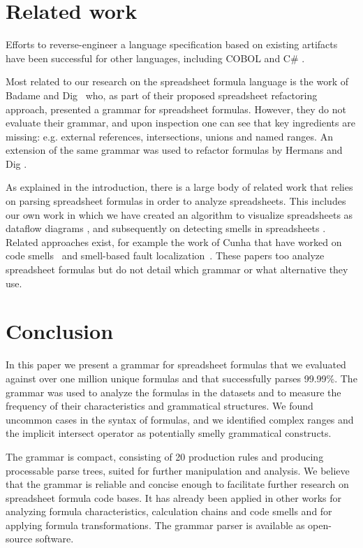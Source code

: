 \documentclass[conference]{IEEEtran}
\begin{document}
\section{Related work}
\label{section:relatedWork}
Efforts to reverse-engineer a language specification based on existing artifacts have been successful for other languages, including COBOL \cite{van1997obtaining} and C\# \cite{zaytsev2010recovery}.

Most related to our research on the spreadsheet formula language is the work of Badame and Dig~\cite{badame2012refactoring} who, as part of their proposed spreadsheet refactoring approach, presented a grammar for spreadsheet formulas. However, they do not evaluate their grammar, and upon inspection one can see that key ingredients are missing: e.g. external references, intersections, unions and named ranges. An extension of the same grammar was used to refactor formulas by Hermans and Dig \cite{hermans2014bumblebee}.

As explained in the introduction, there is a large body of related work that relies on parsing spreadsheet formulas in order to analyze spreadsheets. This includes our own work in which we have created an algorithm to visualize spreadsheets as dataflow diagrams \cite{DBLP:conf/icse/HermansPD11}, and subsequently on detecting smells in spreadsheets \cite{DBLP:conf/icse/HermansPD12,DBLP:conf/icsm/Hermans212}. Related approaches exist, for example the work of Cunha that have worked on code smells~\cite{iccsa12} and smell-based fault localization~\cite{conf/icsme/CunhaFMPS14}. These papers too analyze spreadsheet formulas but do not detail which grammar or what alternative they use.

\section{Conclusion}
\label{section:conclusion}
In this paper we present a grammar for spreadsheet formulas that we evaluated against over one million unique formulas and that successfully parses 99.99\%. The grammar was used to analyze the formulas in the datasets and to measure the frequency of their characteristics and grammatical structures. We found uncommon cases in the syntax of formulas, and we identified complex ranges and the implicit intersect operator as potentially smelly grammatical constructs.

The grammar is compact, consisting of 20 production rules and producing processable parse trees, suited for further manipulation and analysis. We believe that the grammar is reliable and concise enough to facilitate further research on spreadsheet formula code bases. It has already been applied in other works for analyzing formula characteristics, calculation chains and code smells and for applying formula transformations. The grammar parser is available as open-source software.
\end{document}
